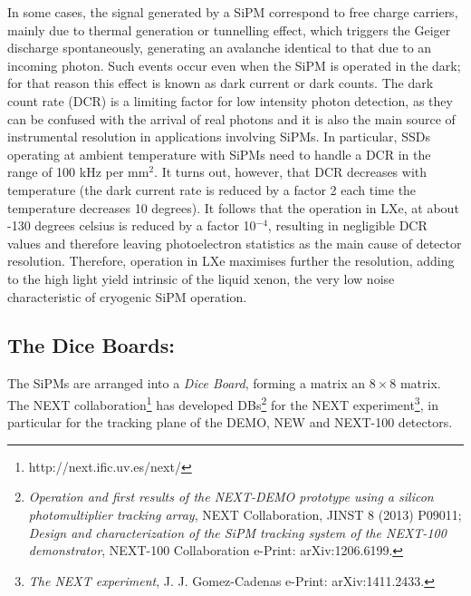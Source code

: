 \documentclass{JINST}
\begin{document}
In some cases, the signal generated by a SiPM correspond to free charge carriers, mainly due to thermal generation or tunnelling effect, which triggers the Geiger discharge spontaneously, generating an avalanche identical to that due to an incoming photon. Such events occur even when the SiPM is operated in the dark; for that reason this effect is known as dark current or dark counts. The dark count rate (DCR) is a limiting factor for low intensity photon detection, as they can be confused with the arrival of real photons and it is also the main source of instrumental resolution in applications involving SiPMs. In particular, SSDs operating at ambient temperature with SiPMs need to handle a DCR in the range of 100 kHz per mm$^2$. It turns out, however, that DCR decreases with temperature (the dark current rate is reduced by a factor 2 each time the temperature decreases 10 degrees). It follows that the operation in LXe, at about -130 degrees celsius is reduced by a factor 10$^{-4}$, resulting in negligible DCR values and therefore leaving photoelectron statistics as the main cause  of detector resolution. Therefore, operation in LXe maximises further the resolution, adding to the high light yield intrinsic of the liquid xenon, the very low noise characteristic of cryogenic SiPM operation. 

\subsection{The Dice Boards:}
\label{sec.dc}


The SiPMs are arranged into a {\em Dice Board}, forming a matrix an $8 \times 8$ matrix.
The NEXT collaboration\footnote{http://next.ific.uv.es/next/} has developed DBs\footnote{{\em
Operation and first results of the NEXT-DEMO prototype using a silicon photomultiplier tracking array}, 
NEXT Collaboration, JINST 8 (2013) P09011; {\em	
Design and characterization of the SiPM tracking system of the NEXT-100 demonstrator}, 
NEXT-100 Collaboration 
e-Print: arXiv:1206.6199. } for the NEXT experiment\footnote{
{\em The NEXT experiment},
J. J. Gomez-Cadenas e-Print: arXiv:1411.2433. }, in particular for the tracking plane of the DEMO, NEW and NEXT-100 detectors. 
\end{document}
